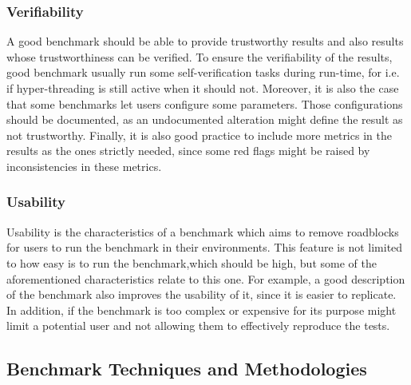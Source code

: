 \subsubsection{Verifiability}
A good benchmark should be able to provide trustworthy results and also results whose trustworthiness can be verified. To ensure the verifiability of the results, good benchmark usually run some self-verification tasks during run-time, for i.e. if hyper-threading is still active when it should not. Moreover, it is also the case that some benchmarks let users configure some parameters. Those configurations should be documented, as an undocumented alteration might define the result as not trustworthy. \cite{how_to_bench}
Finally, it is also good practice to include more metrics in the results as the ones strictly needed, since some red flags might be raised by inconsistencies in these metrics. 
\subsubsection{Usability}
Usability is the characteristics of a benchmark which aims to remove roadblocks for users to run the benchmark in their environments. This feature is not limited to how easy is to run the benchmark,which should be high, but some of the aforementioned characteristics relate to this one. For example, a good description of the benchmark also improves the usability of it, since it is easier to replicate. In addition, if the benchmark is too complex or expensive for its purpose might limit a potential user and not allowing them to effectively reproduce the tests. 



\subsection{Benchmark Techniques and Methodologies}\label{BTaM}

